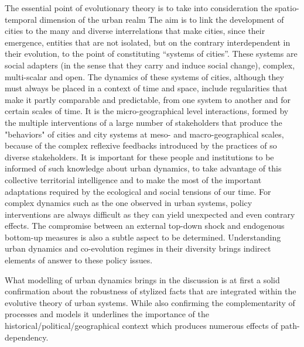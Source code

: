 \documentclass[11pt]{article}
\begin{document}
The essential point of evolutionary theory is to take into consideration the spatio-temporal dimension of the urban realm The aim is to link the development of cities to the many and diverse interrelations that make cities, since their emergence, entities that are not isolated, but on the contrary interdependent in their evolution, to the point of constituting ``systems of cities''. These systems are social adapters (in the sense that they carry and induce social change), complex, multi-scalar and open. The dynamics of these systems of cities, although they must always be placed in a context of time and space, include regularities that make it partly comparable and predictable, from one system to another and for certain scales of time. It is the micro-geographical level interactions, formed by the multiple interventions of a large number of stakeholders that produce the "behaviors" of cities and city systems at meso- and macro-geographical scales, because of the complex reflexive feedbacks introduced by the practices of so diverse stakeholders. It is important for these people and institutions to be informed of such knowledge about urban dynamics, to take advantage of this collective territorial intelligence and to make the most of the important adaptations required by the ecological and social tensions of our time. For complex dynamics such as the one observed in urban systems, policy interventions are always difficult as they can yield unexpected and even contrary effects. The compromise between an external top-down shock and endogenous bottom-up measures is also a subtle aspect to be determined. Understanding urban dynamics and co-evolution regimes in their diversity brings indirect elements of answer to these policy issues.


What modelling of urban dynamics brings in the discussion is at first a solid confirmation about the robustness of stylized facts that are integrated within the evolutive theory of urban systems. While also confirming the complementarity of processes and models it underlines the importance of the historical/political/geographical context which produces numerous effects of path-dependency.
\end{document}
